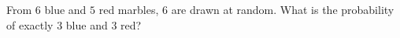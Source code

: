 From $6$ blue and $5$ red marbles, $6$ are drawn at random. What is the probability of exactly $3$ blue and $3$ red?

